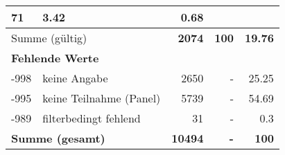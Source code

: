 \begin{longtable}{lXrrr}
       \num{71} &
       \num[round-mode=places,round-precision=2]{3,42} &
         \num[round-mode=places,round-precision=2]{0,68} \\
     \midrule
     \multicolumn{2}{l}{Summe (gültig)} &
       \textbf{\num{2074}} &
     \textbf{100} &
       \textbf{\num[round-mode=places,round-precision=2]{19,76}} \\
     \multicolumn{5}{l}{\textbf{Fehlende Werte}}\\
       -998 &
       keine Angabe &
         \num{2650} &
        - &
         \num[round-mode=places,round-precision=2]{25,25} \\
       -995 &
       keine Teilnahme (Panel) &
         \num{5739} &
        - &
         \num[round-mode=places,round-precision=2]{54,69} \\
       -989 &
       filterbedingt fehlend &
         \num{31} &
        - &
         \num[round-mode=places,round-precision=2]{0,3} \\
     \midrule
     \multicolumn{2}{l}{\textbf{Summe (gesamt)}} &
          \textbf{\num{10494}} &
        \textbf{-} &
        \textbf{100} \\
     \bottomrule
     \end{longtable}
     

